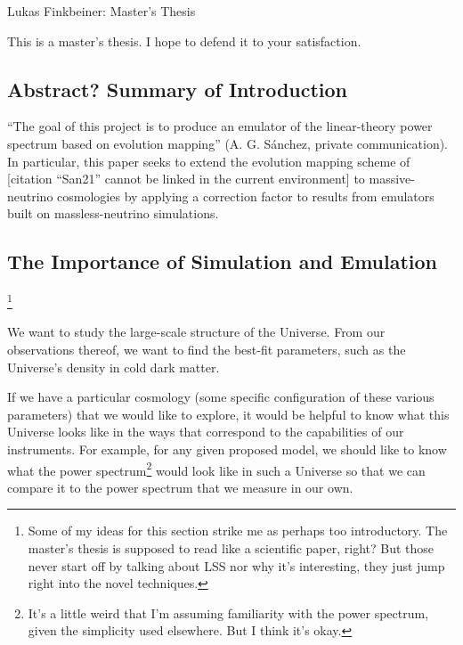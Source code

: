\documentclass[11pt]{article}
\newcommand{\cbib}[1]
{\IfFileExists{biblatex.sty}
{\cite{#1}}
{[citation ``#1'' cannot be linked in the current environment]}}
\begin{document}
\fontsize{12}{15}

\begin{center}
Lukas Finkbeiner: Master's Thesis
\end{center}

This is a master's thesis. I hope to defend it to your satisfaction.

\tableofcontents

\begin{centering}
\section{Abstract? Summary of Introduction}
\end{centering}

``The goal of this project is to produce an emulator of the linear-theory
power spectrum based on evolution mapping'' (A. G. S\'{a}nchez, private
communication). In particular, this paper seeks to extend the evolution mapping
scheme of \cbib{San21} to massive-neutrino cosmologies by applying a correction
factor to results from emulators built on massless-neutrino simulations. 

\begin{centering}
\section{The Importance of Simulation and Emulation}
\end{centering}

\footnote{
    Some of my ideas for this section strike me as perhaps too introductory.
    The master's thesis is supposed to read like a scientific paper, right?
    But those never start off by talking about LSS nor why it's interesting,
    they just jump right into the novel techniques.
}

We want to study the large-scale structure of the Universe. From our
observations thereof, we want to find the best-fit parameters, such as
the Universe's density in cold dark matter.

If we have a particular cosmology (some specific configuration of these various
parameters) that we would like to explore, it would be helpful to know what
this Universe looks like in the ways that correspond to the capabilities of
our instruments. For example, for any given proposed model, we should like to
know what the power spectrum\footnote{It's a little weird that I'm assuming
familiarity with the power spectrum, given the simplicity used elsewhere.
But I think it's okay.} would look like
in such a Universe so that we
can compare it to the power spectrum that we measure in our own.
\end{document}
